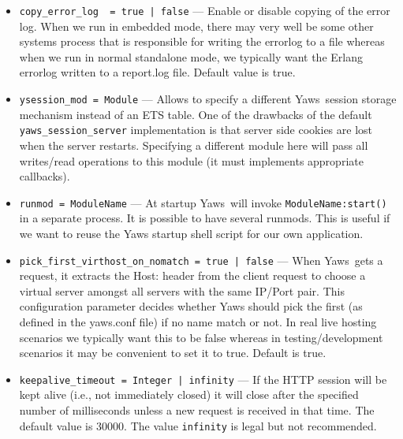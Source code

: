 \documentclass[11pt,oneside,english]{book}
\newcommand{\Yaws}            %
        {{\sc Yaws}}
\begin{document}
\begin{itemize}
\item        \verb+copy_error_log  = true | false+ ---
              Enable or disable copying of the error log. When we run in
              embedded mode, there may very well be some other systems process
              that is responsible for writing the errorlog to a file whereas
              when we run in normal standalone mode, we typically want the
              Erlang errorlog written to a report.log file.  Default value is
              true.

\item        \verb+ysession_mod = Module+ ---
               Allows to specify a different \Yaws\ session storage mechanism
               instead of an ETS table. One of the drawbacks of the default
               \verb+yaws_session_server+ implementation is that server side
               cookies are lost when the server restarts. Specifying a different
               module here will pass all writes/read operations to this module
               (it must implements appropriate callbacks).

\item        \verb+runmod = ModuleName+ ---
               At startup \Yaws\ will invoke \verb+ModuleName:start()+ in a
               separate process. It is possible to have several runmods.  This
               is useful if we want to reuse the Yaws startup shell script for
               our own application.

\item        \verb+pick_first_virthost_on_nomatch = true | false+ ---
              When \Yaws\ gets a request, it extracts the Host: header from the
              client request to choose a virtual server amongst all servers with
              the same IP/Port pair.  This configuration parameter decides
              whether Yaws should pick the first (as defined in the yaws.conf
              file) if no name match or not.  In real live hosting scenarios we
              typically want this to be false whereas in testing/development
              scenarios it may be convenient to set it to true. Default is true.


\item        \verb+keepalive_timeout = Integer | infinity+ ---
              If the HTTP session will be kept alive (i.e., not
              immediately closed) it will close after the specified
              number of milliseconds unless a new request is received
              in that time. The default value is 30000. The value
              \verb+infinity+ is legal but not recommended.


\end{itemize}
\end{document}
